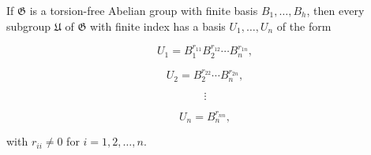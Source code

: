 If $\mathfrak{G}$ is a torsion-free Abelian group with finite basis $B_1, \ldots, B_h$, then every subgroup $\mathfrak{U}$ of $\mathfrak{G}$ with finite index has a basis $U_1, \ldots, U_n$ of the form

$$U_1 = B_1^{r_{11}} B_2^{r_{12}} \cdots B_n^{r_{1n}},$$

$$U_2 = B_2^{r_{22}} \cdots B_n^{r_{2n}},$$

$$\vdots$$

$$U_n = B_n^{r_{nn}},$$

with $r_{ii} \neq 0$ for $i = 1, 2, \ldots, n$.
